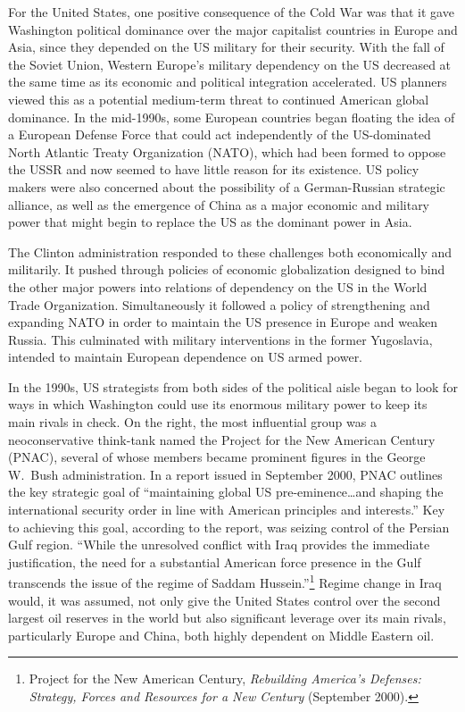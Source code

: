 For the United States, one positive consequence of the Cold War was that it gave Washington political dominance over the major capitalist countries in Europe and Asia, since they depended on the US military for their security. With the fall of the Soviet Union, Western Europe's military dependency on the US decreased at the same time as its economic and political integration accelerated. US planners viewed this as a potential medium-term threat to continued American global dominance. In the mid-1990s, some European countries began floating the idea of a European Defense Force that could act independently of the US-dominated North Atlantic Treaty Organization (NATO), which had been formed to oppose the USSR and now seemed to have little reason for its existence. US policy makers were also concerned about the possibility of a German-Russian strategic alliance, as well as the emergence of China as a major economic and military power that might begin to replace the US as the dominant power in Asia.

The Clinton administration responded to these challenges both economically and militarily. It pushed through policies of economic globalization designed to bind the other major powers into relations of dependency on the US in the World Trade Organization. Simultaneously it followed a policy of strengthening and expanding NATO in order to maintain the US presence in Europe and weaken Russia. This culminated with military interventions in the former Yugoslavia, intended to maintain European dependence on US armed power.

In the 1990s, US strategists from both sides of the political aisle began to look for ways in which Washington could use its enormous military power to keep its main rivals in check. On the right, the most influential group was a neoconservative think-tank named the Project for the New American Century (PNAC), several of whose members became prominent figures in the George W.\ Bush administration. In a report issued in September 2000, PNAC outlines the key strategic goal of ``maintaining global US pre-eminence\ldots and shaping the international security order in line with American principles and interests.'' Key to achieving this goal, according to the report, was seizing control of the Persian Gulf region. ``While the unresolved conflict with Iraq provides the immediate justification, the need for a substantial American force presence in the Gulf transcends the issue of the regime of Saddam Hussein.''\footnote{Project for the New American Century, \emph{Rebuilding America's Defenses: Strategy, Forces and Resources for a New Century} (September 2000).} Regime change in Iraq would, it was assumed, not only give the United States control over the second largest oil reserves in the world but also significant leverage over its main rivals, particularly Europe and China, both highly dependent on Middle Eastern oil.

